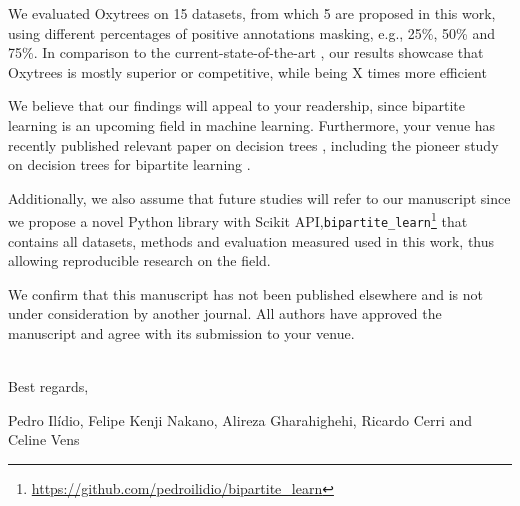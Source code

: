 \documentclass{article}
\begin{document}
We evaluated Oxytrees on 15 datasets, from which 5 are proposed in this work, using different percentages of positive annotations masking, e.g., 25\%, 50\% and 75\%. In comparison to the current-state-of-the-art \cite{pliakos_drug-target_2020}, our results showcase that Oxytrees is mostly superior or competitive, while being X times more efficient 


We believe that our findings will appeal to your readership, since bipartite learning is an upcoming field in machine learning. Furthermore, your venue has recently published relevant paper on decision trees \cite{raymaekers2024fast, surer2024coefficient}, including the pioneer study on decision trees for bipartite learning  \cite{pliakos_global_2018}. 


Additionally, we also assume that future studies will refer to our manuscript since we propose a novel Python library with Scikit API,\texttt{bipartite\_learn}\footnote{\url{
https://github.com/pedroilidio/bipartite_learn}} that contains all datasets, methods and evaluation measured used in this work, thus allowing reproducible research on the field.

We confirm that this manuscript has not been published elsewhere and is not under consideration by another journal. All authors have approved the manuscript and agree with its submission to your venue.


~\\
Best regards,

Pedro Ilídio, Felipe Kenji Nakano, Alireza Gharahighehi, Ricardo Cerri and Celine Vens


\end{document}
